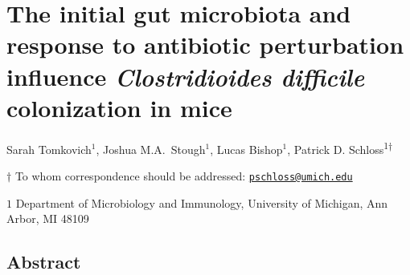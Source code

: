 \documentclass[
  11pt,
]{article}
\author{}
\date{\vspace{-2.5em}}
\begin{document}
\vspace{35mm}

\hypertarget{the-initial-gut-microbiota-and-response-to-antibiotic-perturbation-influence-clostridioides-difficile-colonization-in-mice}{%
\section{\texorpdfstring{The initial gut microbiota and response to
antibiotic perturbation influence \emph{Clostridioides difficile}
colonization in
mice}{The initial gut microbiota and response to antibiotic perturbation influence Clostridioides difficile colonization in mice}}\label{the-initial-gut-microbiota-and-response-to-antibiotic-perturbation-influence-clostridioides-difficile-colonization-in-mice}}

\vspace{35mm}

Sarah Tomkovich\({^1}\), Joshua M.A.~Stough\({^1}\), Lucas
Bishop\({^1}\), Patrick D. Schloss\textsuperscript{1\(\dagger\)}

\vspace{40mm}

\(\dagger\) To whom correspondence should be addressed:
\href{mailto:pschloss@umich.edu}{\nolinkurl{pschloss@umich.edu}}

\(1\) Department of Microbiology and Immunology, University of Michigan,
Ann Arbor, MI 48109

\newpage
\linenumbers

\hypertarget{abstract}{%
\subsection{Abstract}\label{abstract}}
\end{document}
